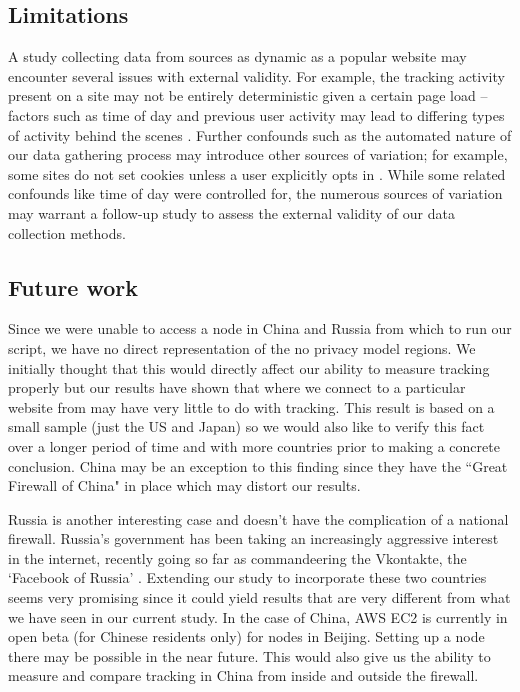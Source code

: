 \documentclass[conference]{IEEEtran}
\begin{document}
\subsection{Limitations}
A study collecting data from sources as dynamic as a popular website may encounter several issues with external validity. For example, the tracking activity present on a site may not be entirely deterministic given a certain page load -- factors such as time of day and previous user activity may lead to differing types of activity behind the scenes \cite{exchangewire}. Further confounds such as the automated nature of our data gathering process may introduce other sources of variation; for example, some sites do not set cookies unless a user explicitly opts in \cite{ico}. While some related confounds like time of day were controlled for, the numerous sources of variation may warrant a follow-up study to assess the external validity of our data collection methods.



\subsection{Future work}
Since we were unable to access a node in China and Russia from which to run our script, we have no direct representation of the no privacy model regions. We initially thought that this would directly affect our ability to measure tracking properly but our results have shown that where we connect to a particular website from may have very little to do with tracking. This result is based on a small sample (just the US and Japan) so we would also like to verify this fact over a longer period of time and with more countries prior to making a concrete conclusion. China may be an exception to this finding since they have the ``Great Firewall of China" in place which may distort our results.	

Russia is another interesting case and doesn't have the complication of a national firewall. Russia's government has been taking an increasingly aggressive interest in the internet, recently going so far as commandeering the Vkontakte, the `Facebook of Russia' \cite{toor}. Extending our study to incorporate these two countries seems very promising since it could yield results that are very different from what we have seen in our current study. In the case of China, AWS EC2 is currently in open beta (for Chinese residents only) for nodes in Beijing. Setting up a node there may be possible in the near future. This would also give us the ability to measure and compare tracking in China from inside and outside the firewall.
\end{document}

